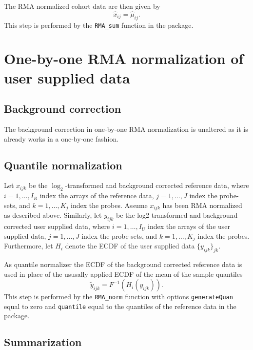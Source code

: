 The RMA normalized cohort data are then given by
\begin{equation*}
   \hat{x}_{ij} = \hat{\mu}_{ij}.
\end{equation*}
This step is performed by the \texttt{RMA\_sum} function in the \hemaClass{} package.




\section{One-by-one RMA normalization of user supplied data}
\subsection{Background correction}

The background correction in one-by-one RMA normalization is unaltered as it is already works in a one-by-one fashion.


\subsection{Quantile normalization}

Let $x_{ijk}$ be the $\log_2$-transformed and background corrected reference data, where $i = 1,\dots,I_R$ index the arrays of the reference data, $j=1,\dots,J$ index the probe-sets, and $k=1,\dots,K_j$ index the probes.
Assume $x_{ijk}$ has been RMA normalized as described above.
Similarly, let $y_{ijk}$ be the log2-transformed and background corrected user supplied data, where $i = 1,\dots,I_U$ index the arrays of the user supplied data, $j=1,\dots,J$  index the probe-sets, and $k=1,\dots,K_j$ index the probes.
Furthermore, let $H_i$ denote the ECDF of the user supplied data $\{y_{ijk}\}_{jk}$.

As quantile normalizer the ECDF of the background corrected reference data is used in place of the ususally applied ECDF of the mean of the sample quantiles
\begin{equation*}
   \tilde{y}_{ijk} = F^{-1}(H_i(y_{ijk})).
\end{equation*}
This step is performed by the \texttt{RMA\_norm} function with options \texttt{generateQuan} equal to zero and \texttt{quantile} equal to the quantiles of the reference data in the  package.


\subsection{Summarization}

